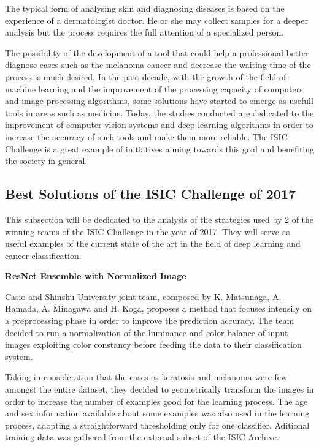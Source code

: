\documentclass[10pt]{IEEEtran}
\begin{document}
The typical form of analysing skin and diagnosing diseases is based on the experience of a dermatologist doctor. 
He or she may collect samples for a deeper analysis but the process requires the full attention of a specialized person.

The possibility of the development of a tool that could help a professional better diagnose cases such as the melanoma cancer and decrease the waiting time of the process is much desired.
In the past decade, with the growth of the field of machine learning and the improvement of the processing capacity of computers and image processing algorithms, some solutions have started to emerge as usefull tools in areas such as medicine.
Today, the studies conducted are dedicated to the improvement of computer vision systems and deep learning algorithms in order to increase the accuracy of such tools and make them more reliable.
The ISIC Challenge is a great example of initiatives aiming towards this goal and benefiting the society in general.

\subsection{Best Solutions of the ISIC Challenge of 2017}

This subsection will be dedicated to the analysis of the strategies used by 2 of the winning teams of the ISIC Challenge in the year of 2017. 
They will serve as useful examples of the current state of the art in the field of deep learning and cancer classification.
\newline{}

\textbf{ResNet Ensemble with Normalized Image}

Casio and Shinshu University joint team, composed by K. Matsunaga, A. Hamada, A. Minagawa and H. Koga, proposes a method that focuses intensily on a preprocessing phase in order to improve the prediction accuracy.
The team decided to run a normalization of the luminance and color balance of input images exploiting color constancy before feeding the data to their classification system. 

Taking in consideration that the cases os keratosis and melanoma were few amongst the entire dataset, they decided to geometrically transform the images in order to increase the number of examples good for the learning process.
The age and sex information available about some examples was also used in the learning process, adopting a straightforward thresholding only for one classifier.
Aditional training data was gathered from the external subset of the ISIC Archive. 
\end{document}
